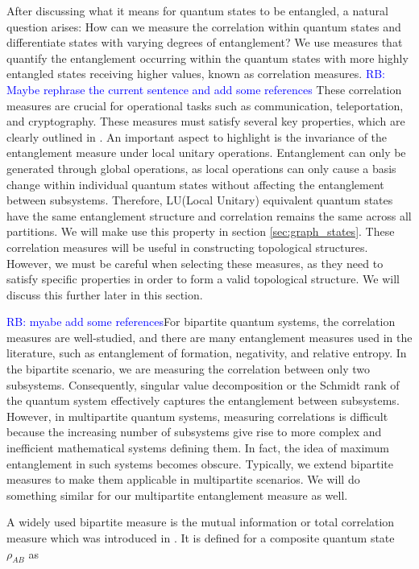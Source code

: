 \documentclass{article}
\newcommand{\rb}[1]{{\textcolor{blue}{RB: #1}}}
\begin{document}
After discussing what it means for quantum states to be entangled, a natural question arises: How can we measure the correlation within quantum states and differentiate states with varying degrees of entanglement?
We use measures that quantify the entanglement occurring within the quantum states with more highly entangled states receiving higher values, known as correlation measures. \rb{Maybe rephrase the current sentence and add some references} These correlation measures are crucial for operational tasks such as communication, teleportation, and cryptography. These measures must satisfy several key properties, which are clearly outlined in \cite{guhne2009entanglement}. An important aspect to highlight is the invariance of the entanglement measure under local unitary operations. Entanglement can only be generated through global operations, as local operations can only cause a basis change within individual quantum states without affecting the entanglement between subsystems. Therefore, LU(Local Unitary) equivalent quantum states have the same entanglement structure and correlation remains the same across all partitions. We will make use this property in section \ref{sec:graph_states}. These correlation measures will be useful in constructing topological structures. However, we must be careful when selecting these measures, as they need to satisfy specific properties in order to form a valid topological structure. We will discuss this further later in this section.

\rb{myabe add some references}For bipartite quantum systems, the correlation measures are well-studied, and there are many entanglement measures used in the literature, such as entanglement of formation, negativity, and relative entropy. In the bipartite scenario, we are measuring the correlation between only two subsystems. Consequently, singular value decomposition or the Schmidt rank of the quantum system effectively captures the entanglement between subsystems. However, in multipartite quantum systems, measuring correlations is difficult because the increasing number of subsystems give rise to more complex and inefficient mathematical systems defining them. In fact, the idea of maximum entanglement in such systems becomes obscure. Typically, we extend bipartite measures to make them applicable in multipartite scenarios. We will do something similar for our multipartite entanglement measure as well.

A widely used bipartite measure is the mutual information or total correlation measure which was introduced in \cite{cerf1998information}. It is defined for a composite quantum state $\rho_{AB}$ as 
\end{document}
